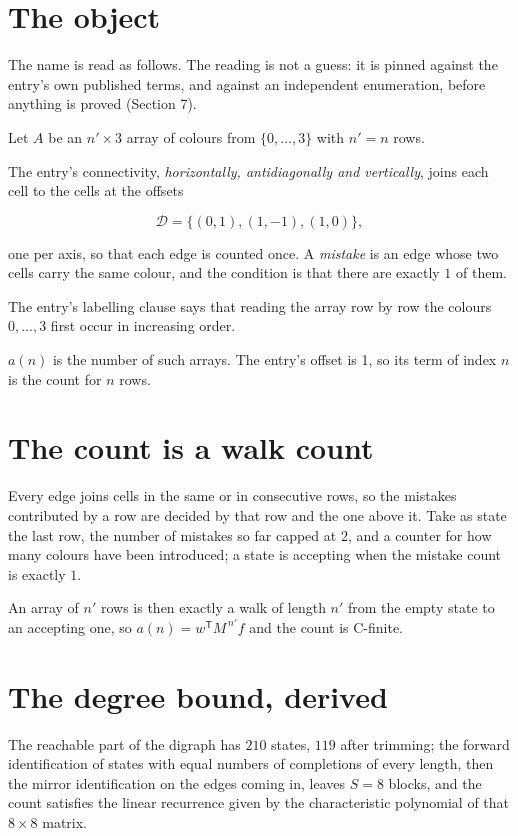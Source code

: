 \documentclass[11pt]{article}
\theoremstyle{definition}
\begin{document}
\section{The object}

The name is read as follows. The reading is not a guess: it is pinned against the entry's own published terms, and against an independent enumeration, before anything is proved (Section 7).

Let $A$ be an $n' \times 3$ array of colours from $\{0,\dots,3\}$ with $n' = n$ rows.

The entry's connectivity, {\itshape horizontally, antidiagonally and vertically}, joins each cell to the cells at the offsets

\[\mathcal{D} = \{(0,1), (1,-1), (1,0)\},\]

one per axis, so that each edge is counted once. A {\itshape mistake} is an edge whose two cells carry the same colour, and the condition is that there are exactly $1$ of them.

The entry's labelling clause says that reading the array row by row the colours $0,\dots,3$ first occur in increasing order.

$a(n)$ is the number of such arrays. The entry's offset is 1, so its term of index $n$ is the count for $n$ rows.

\section{The count is a walk count}

Every edge joins cells in the same or in consecutive rows, so the mistakes contributed by a row are decided by that row and the one above it. Take as state the last row, the number of mistakes so far capped at $2$, and a counter for how many colours have been introduced; a state is accepting when the mistake count is exactly $1$.

An array of $n'$ rows is then exactly a walk of length $n'$ from the empty state to an accepting one, so $a(n) = w^{\mathsf T}M^{\,n'}f$ and the count is C-finite.

\section{The degree bound, derived}

The reachable part of the digraph has $210$ states, $119$ after trimming; the forward identification of states with equal numbers of completions of every length, then the mirror identification on the edges coming in, leaves $S = 8$ blocks, and the count satisfies the linear recurrence given by the characteristic polynomial of that $8\times8$ matrix.
\end{document}
